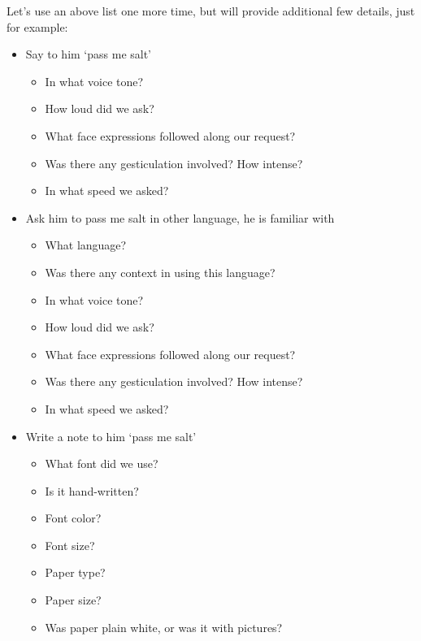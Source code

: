 \documentclass{article}
\begin{document}
            Let's use an above list one more time, but will provide additional few details, just for example:

            \begin{itemize}
                \item Say to him `pass me salt'
                \begin{itemize}
                    \item In what voice tone?
                    \item How loud did we ask?
                    \item What face expressions followed along our request?
                    \item Was there any gesticulation involved? How intense?
                    \item In what speed we asked?
                \end{itemize}

                \item Ask him to pass me salt in other language, he is familiar with
                \begin{itemize}
                    \item What language?
                    \item Was there any context in using this language?
                    \item In what voice tone?
                    \item How loud did we ask?
                    \item What face expressions followed along our request?
                    \item Was there any gesticulation involved? How intense?
                    \item In what speed we asked?
                \end{itemize}

                \item Write a note to him `pass me salt'
                \begin{itemize}
                    \item What font did we use?
                    \item Is it hand-written?
                    \item Font color?
                    \item Font size?
                    \item Paper type?
                    \item Paper size?
                    \item Was paper plain white, or was it with pictures?
                \end{itemize}


\end{itemize}
\end{document}
